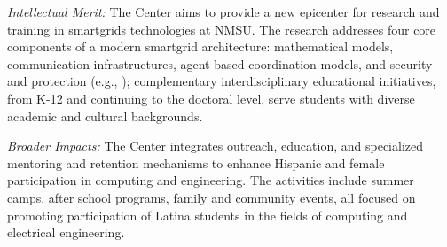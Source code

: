 \noindent\textit{Intellectual Merit:} The Center aims to provide a new epicenter for research and training in smartgrids technologies at NMSU. The
	 research addresses four core components of a modern smartgrid architecture: mathematical models, communication infrastructures,   
	 agent-based coordination models, and security and protection (e.g., \cite{cp15,ToSP15,LeSP15b,LeSPY15,LeF0SP16,TiepSP19,ChowdhuryKS018,2016grid,SonPNS14}); complementary interdisciplinary educational initiatives, from K-12 and continuing to the doctoral level,  serve students with diverse academic and cultural backgrounds. 
	 
\noindent\textit{Broader Impacts:} The Center integrates outreach, education, and specialized mentoring and retention mechanisms to enhance Hispanic and female participation in computing and engineering. The activities include summer camps, after school programs, family and community events, all focused on promoting participation of Latina students in the fields of computing and electrical engineering.




